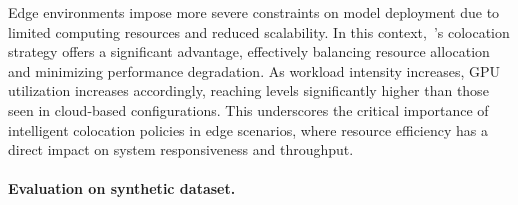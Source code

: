 Edge environments impose more severe constraints on model deployment due to limited computing resources and reduced scalability. In this context,~\roomie's colocation strategy offers a significant advantage, effectively balancing resource allocation and minimizing performance degradation. As workload intensity increases, GPU utilization increases accordingly, reaching levels significantly higher than those seen in cloud-based configurations. This underscores the critical importance of intelligent colocation policies in edge scenarios, where resource efficiency has a direct impact on system responsiveness and throughput.

\paragraph{Evaluation on synthetic dataset.}

